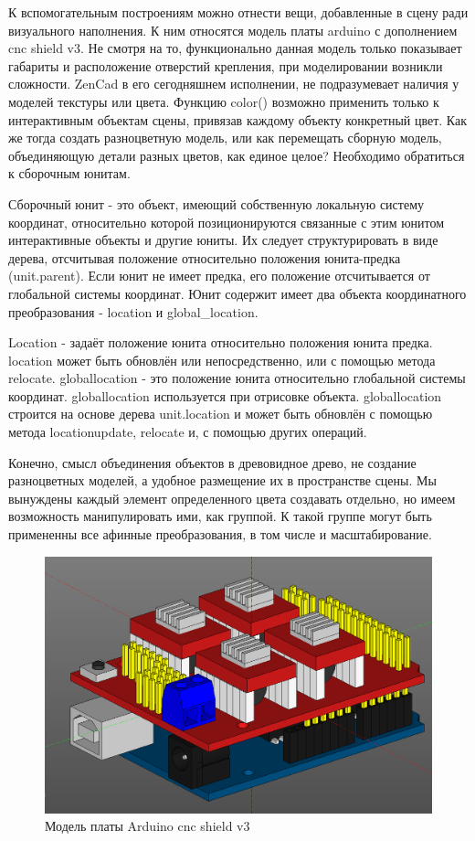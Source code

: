 К вспомогательным построениям можно отнести вещи, добавленные в сцену ради визуального наполнения. К ним относятся модель платы arduino с дополнением cnc shield v3. Не смотря на то, функционально данная модель только показывает габариты и расположение отверстий крепления, при моделировании возникли сложности. ZenCad в его сегодняшнем исполнении, не подразумевает наличия у моделей текстуры или цвета. Функцию color() возможно применить только к интерактивным объектам сцены, привязав каждому объекту конкретный цвет. Как же тогда создать разноцветную модель, или как перемещать сборную модель, объединяющую детали разных цветов, как единое целое? Необходимо обратиться к сборочным юнитам.

Сборочный юнит - это объект, имеющий собственную локальную систему координат, относительно которой позиционируются связанные с этим юнитом интерактивные объекты и другие юниты. Их следует структурировать в виде дерева, отсчитывая  положение относительно положения юнита-предка (unit.parent). Если юнит не имеет предка, его положение отсчитывается от глобальной системы координат.
Юнит содержит имеет два объекта координатного преобразования - location и global\_location. 

Location - задаёт положение юнита относительно положения юнита предка. location может быть обновлён или непосредственно, или с помощью метода relocate.
globallocation - это положение юнита относительно глобальной системы координат. globallocation используется при отрисовке объекта. globallocation строится на основе дерева unit.location и может быть обновлён с помощью метода locationupdate, relocate и, с помощью других операций.

Конечно, смысл объединения объектов в древовидное древо, не создание разноцветных моделей, а удобное размещение их в пространстве сцены. Мы вынуждены каждый элемент определенного цвета создавать отдельно, но имеем возможность манипулировать ими, как группой. К такой группе могут быть примененны все афинные преобразования, в том числе и масштабирование.

\begin{figure}[h]
\centering
\includegraphics[width=0.8\linewidth]{./image/arduino}
\caption{Модель платы Arduino cnc shield v3}
\end{figure}




